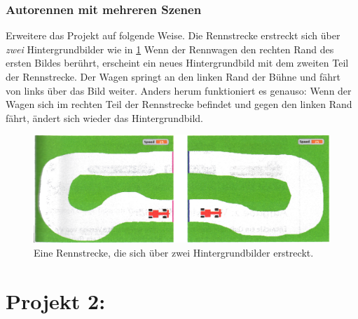 \documentclass[12pt,a4paper,titlepage]{article}
\begin{document}
\subsubsection{Autorennen mit mehreren Szenen}

Erweitere das Projekt auf folgende Weise. Die Rennstrecke erstreckt sich über \textit{zwei} Hintergrundbilder wie in \cref{fig:erweiterung} Wenn der Rennwagen den rechten Rand des ersten Bildes berührt, erscheint ein neues Hintergrundbild mit dem zweiten Teil der Rennstrecke. Der Wagen springt an den linken Rand der Bühne und fährt von links über das Bild weiter. Anders herum funktioniert es genauso: Wenn der Wagen sich im rechten Teil der Rennstrecke befindet und gegen den linken Rand fährt, ändert sich wieder das Hintergrundbild.

\begin{figure}[H]
\centering
\includegraphics{rennbahn3.jpg}
\caption{Eine Rennstrecke, die sich über zwei Hintergrundbilder erstreckt.}
\label{fig:erweiterung}
\end{figure}

\section{Projekt 2:}
\label{sec:projekt2}
\end{document}
